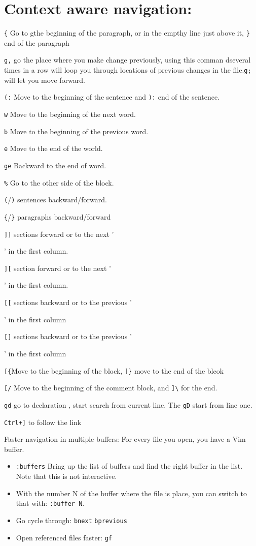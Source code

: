 \documentclass[11pt]{book}
\begin{document}
 \section{Context aware navigation:}
 \begin{itemize}
 \item \verb|{| Go to gthe beginning of the paragraph, or in the empthy line
  just above it, \verb|}| end of the paragraph
 \item \verb|g,| go the place where you make change previously, using this
 comman dseveral times in a row will loop you through locations of previous
 changes in the file.\verb|g;| will let you move forward.
 \item \verb|(:| Move to the beginning of the sentence and \verb|):| end of the
 sentence.
 \item \verb|w| Move to the beginning of the next word.
 \item \verb|b| Move to the beginning of the previous word.
 \item \verb|e| Move to the end of the world.
 \item \verb|ge| Backward to the end of word.
 \item \verb|%| Go to the other side of the block.
 \item \verb|(|/\verb|)| sentences backward/forward.
 \item \verb|{|/\verb|}| paragraphs backward/forward
 \item \verb|]]| sections forward or to the next '{' in the first column.
 \item \verb|][| section forward or to the next '}' in the first column.
 \item \verb|[[| sections backward or to the previous '{' in the first column
 \item \verb|[]| sections backward or to the previous '}' in the first column
 \item \verb|[{|Move to the beginning of the block, \verb|]}| move to the end of
 the blcok
 \item \verb|[/| Move to the beginning of the comment block, and \verb|]\| for
 the end.
 \item \verb|gd| go to declaration , start search from current line. The
 \verb|gD| start from line one.
 \item \verb|Ctrl+]| to follow the link
 \end{itemize}

 Faster navigation in multiple buffers:
 For every file you open, you have a Vim buffer.
 \begin{itemize}
 \item \verb|:buffers| Bring up the list of buffers and find the right buffer in
 the list. Note that this is not interactive.
 \item With the number N of the buffer where the file is place, you can switch
 to that with: \verb|:buffer N|.
 \item Go cycle through: \verb|bnext| \verb|bprevious|
 \item Open referenced files faster: \verb|gf|
 \end{itemize}
\end{document}
